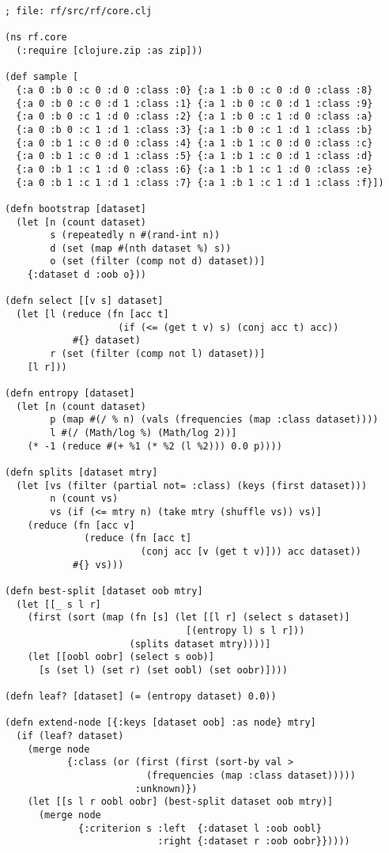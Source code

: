 \documentclass[a4paper,man,12pt,apacite,floatsintext,draftfirst]{apa6} %
\begin{document}
\newpage
\begin{verbatim}
; file: rf/src/rf/core.clj

(ns rf.core
  (:require [clojure.zip :as zip]))

(def sample [
  {:a 0 :b 0 :c 0 :d 0 :class :0} {:a 1 :b 0 :c 0 :d 0 :class :8}
  {:a 0 :b 0 :c 0 :d 1 :class :1} {:a 1 :b 0 :c 0 :d 1 :class :9}
  {:a 0 :b 0 :c 1 :d 0 :class :2} {:a 1 :b 0 :c 1 :d 0 :class :a}
  {:a 0 :b 0 :c 1 :d 1 :class :3} {:a 1 :b 0 :c 1 :d 1 :class :b}
  {:a 0 :b 1 :c 0 :d 0 :class :4} {:a 1 :b 1 :c 0 :d 0 :class :c}
  {:a 0 :b 1 :c 0 :d 1 :class :5} {:a 1 :b 1 :c 0 :d 1 :class :d}
  {:a 0 :b 1 :c 1 :d 0 :class :6} {:a 1 :b 1 :c 1 :d 0 :class :e}
  {:a 0 :b 1 :c 1 :d 1 :class :7} {:a 1 :b 1 :c 1 :d 1 :class :f}])

(defn bootstrap [dataset]
  (let [n (count dataset)
        s (repeatedly n #(rand-int n))
        d (set (map #(nth dataset %) s))
        o (set (filter (comp not d) dataset))]
    {:dataset d :oob o}))

(defn select [[v s] dataset]
  (let [l (reduce (fn [acc t]
                    (if (<= (get t v) s) (conj acc t) acc))
            #{} dataset)
        r (set (filter (comp not l) dataset))]
    [l r]))

(defn entropy [dataset]
  (let [n (count dataset)
        p (map #(/ % n) (vals (frequencies (map :class dataset))))
        l #(/ (Math/log %) (Math/log 2))]
    (* -1 (reduce #(+ %1 (* %2 (l %2))) 0.0 p))))

(defn splits [dataset mtry]
  (let [vs (filter (partial not= :class) (keys (first dataset)))
        n (count vs)
        vs (if (<= mtry n) (take mtry (shuffle vs)) vs)]
    (reduce (fn [acc v]
              (reduce (fn [acc t]
                        (conj acc [v (get t v)])) acc dataset))
            #{} vs)))

(defn best-split [dataset oob mtry]
  (let [[_ s l r]
    (first (sort (map (fn [s] (let [[l r] (select s dataset)]
                                [(entropy l) s l r]))
                      (splits dataset mtry))))]
    (let [[oobl oobr] (select s oob)]
      [s (set l) (set r) (set oobl) (set oobr)])))

(defn leaf? [dataset] (= (entropy dataset) 0.0))

(defn extend-node [{:keys [dataset oob] :as node} mtry]
  (if (leaf? dataset)
    (merge node
           {:class (or (first (first (sort-by val >
                         (frequencies (map :class dataset)))))
                       :unknown)})
    (let [[s l r oobl oobr] (best-split dataset oob mtry)]
      (merge node
             {:criterion s :left  {:dataset l :oob oobl}
                           :right {:dataset r :oob oobr}}))))


\end{verbatim}
\end{document}
